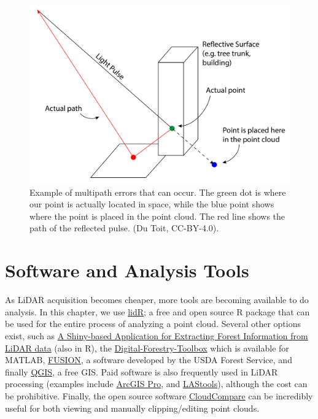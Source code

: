 \documentclass[
]{book}
\begin{document}
\begin{figure}
\includegraphics[width=0.7\linewidth]{images/15-Multipath-Error} \caption{Example of multipath errors that can occur. The green dot is where our point is actually located in space, while the blue point shows where the point is placed in the point cloud. The red line shows the path of the reflected pulse. (Du Toit, CC-BY-4.0).}\label{fig:15-multipath-error}
\end{figure}

\hypertarget{software-and-analysis-tools}{%
\section{Software and Analysis Tools}\label{software-and-analysis-tools}}

As LiDAR acquisition becomes cheaper, more tools are becoming available to do analysis. In this chapter, we use \href{https://cran.r-project.org/web/packages/lidR/}{lidR}; a free and open source R package that can be used for the entire process of analyzing a point cloud. Several other options exist, such as \href{https://github.com/carlos-alberto-silva/weblidar-treetop}{A Shiny-based Application for Extracting Forest Information from LiDAR data} (also in R), the \href{http://mparkan.github.io/Digital-Forestry-Toolbox/}{Digital-Forestry-Toolbox} which is available for MATLAB, \href{http://forsys.cfr.washington.edu/fusion/fusion_overview.html}{FUSION}, a software developed by the USDA Forest Service, and finally \href{https://www.qgis.org/en/site/}{QGIS}, a free GIS. Paid software is also frequently used in LiDAR processing (examples include \href{https://www.esri.com/en-us/home}{ArcGIS Pro}, and \href{https://rapidlasso.com/lastools/}{LAStools}), although the cost can be prohibitive. Finally, the open source software \href{https://www.danielgm.net/cc/}{CloudCompare} can be incredibly useful for both viewing and manually clipping/editing point clouds.
\end{document}
